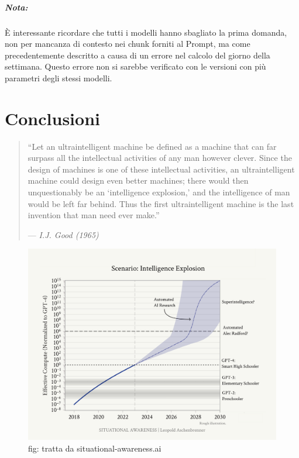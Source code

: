 \documentclass[12pt,a4paper,openright,twoside]{book}
\begin{document}
\paragraph{Nota:} È interessante ricordare che tutti i modelli hanno sbagliato la prima domanda,
non per mancanza di contesto nei chunk forniti al Prompt, ma come precedentemente descritto a causa di un errore nel calcolo del giorno della settimana.
Questo errore non si sarebbe verificato con le versioni con più parametri degli stessi modelli.

\chapter{Conclusioni}
\begin{quote}
    “Let an ultraintelligent machine be defined as a machine that can far surpass all the intellectual activities of any man however clever.
    Since the design of machines is one of these intellectual activities, an ultraintelligent machine could design even better machines; there would then unquestionably be an ‘intelligence explosion,’ and the intelligence of man would be left far behind.
    Thus the first ultraintelligent machine is the last invention that man need ever make.”
    
    \hfill--- \textit{I.J. Good (1965)\cite{Good1965}}
\end{quote}
\begin{figure}[h]
    \centering
    \includegraphics[width=\textwidth]{figures/intelligence_explosion.png}
    \caption{fig: tratta da situational-awareness.ai}
\end{figure}
\end{document}
